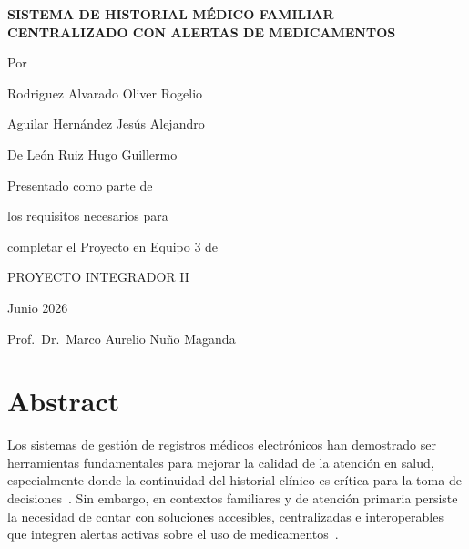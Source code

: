 \documentclass[12pt, letterpaper]{report}
\begin{document}
\begin{titlepage}
  \centering
  \vspace*{1cm}
  {\Large\bfseries SISTEMA DE HISTORIAL MÉDICO FAMILIAR\\[6pt]
  CENTRALIZADO CON ALERTAS DE MEDICAMENTOS\par}
  \vspace{1.5cm}
  {\large Por\par}
  \vspace{0.6cm}
  {\large Rodriguez Alvarado Oliver Rogelio\par}
  {\large Aguilar Hernández Jesús Alejandro \par}
  {\large De León Ruiz Hugo Guillermo\par}
  \vspace{1.5cm}
  {\large Presentado como parte de\par}
  {\large los requisitos necesarios para\par}
  {\large completar el Proyecto en Equipo 3 de\par}
  \vspace{1.5cm}
  {\large PROYECTO INTEGRADOR II\par}
  \vspace{1cm}
  {\large Junio 2026\par}
  \vspace{1cm}
  {\large Prof.\ Dr.\ Marco Aurelio Nuño Maganda\par}
  \vfill
\end{titlepage}

\setcounter{page}{2}

\chapter*{Abstract}

Los sistemas de gestión de registros médicos electrónicos han demostrado ser herramientas
fundamentales para mejorar la calidad de la atención en salud, especialmente donde la
continuidad del historial clínico es crítica para la toma de decisiones~\cite{tsai2020effects}.
Sin embargo, en contextos familiares y de atención primaria persiste la necesidad de contar
con soluciones accesibles, centralizadas e interoperables que integren alertas activas sobre
el uso de medicamentos~\cite{gamache2018personal}.
\end{document}
